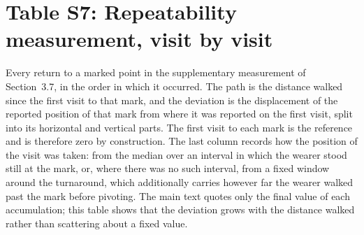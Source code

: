 
\section*{Table S7: Repeatability measurement, visit by visit}

Every return to a marked point in the supplementary measurement of
Section~3.7, in the order in which it occurred. The path is the distance walked
since the first visit to that mark, and the deviation is the displacement of the
reported position of that mark from where it was reported on the first visit,
split into its horizontal and vertical parts. The first visit to each mark is the
reference and is therefore zero by construction. The last column records how the
position of the visit was taken: from the median over an interval in which the
wearer stood still at the mark, or, where there was no such interval, from a
fixed window around the turnaround, which additionally carries however far the
wearer walked past the mark before pivoting. The main text quotes only the final
value of each accumulation; this table shows that the deviation grows with the
distance walked rather than scattering about a fixed value.

